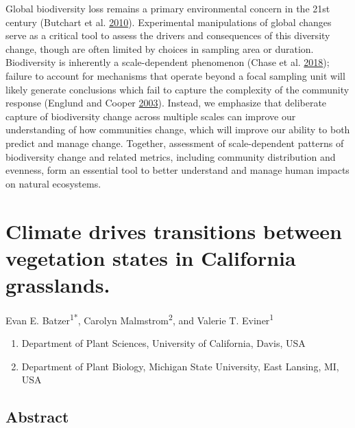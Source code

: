 \documentclass[twoside,12pt,final]{ucthesis-CA2012}
\providecommand{\tightlist}{%
  \setlength{\itemsep}{0pt}\setlength{\parskip}{0pt}}
\begin{document}
\begin{ucmainmatter}
Global biodiversity loss remains a primary environmental concern in the 21st century (Butchart et al. \protect\hyperlink{ref-butchart2010}{2010}). Experimental manipulations of global changes serve as a critical tool to assess the drivers and consequences of this diversity change, though are often limited by choices in sampling area or duration. Biodiversity is inherently a scale-dependent phenomenon (Chase et al. \protect\hyperlink{ref-chase2018}{2018}); failure to account for mechanisms that operate beyond a focal sampling unit will likely generate conclusions which fail to capture the complexity of the community response (Englund and Cooper \protect\hyperlink{ref-englund2003}{2003}). Instead, we emphasize that deliberate capture of biodiversity change across multiple scales can improve our understanding of how communities change, which will improve our ability to both predict and manage change. Together, assessment of scale-dependent patterns of biodiversity change and related metrics, including community distribution and evenness, form an essential tool to better understand and manage human impacts on natural ecosystems.

\hypertarget{climate-drives-transitions-between-vegetation-states-in-california-grasslands.}{%
\chapter{Climate drives transitions between vegetation states in California grasslands.}\label{climate-drives-transitions-between-vegetation-states-in-california-grasslands.}}


Evan E. Batzer\textsuperscript{1*},
Carolyn Malmstrom\textsuperscript{2},
and Valerie T. Eviner\textsuperscript{1}
\begin{enumerate}
\def\labelenumi{\arabic{enumi}.}
\tightlist
\item
  Department of Plant Sciences, University of California, Davis, USA
\item
  Department of Plant Biology, Michigan State University, East Lansing, MI, USA
\end{enumerate}
\hypertarget{abstract}{%
\section{Abstract}\label{abstract}}


\end{ucmainmatter}
\end{document}

